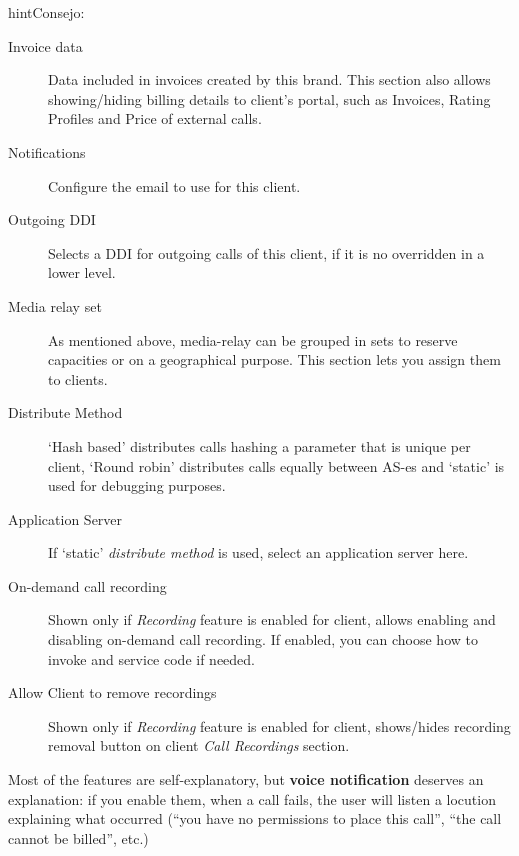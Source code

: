 \documentclass[letterpaper,10pt,spanish]{sphinxmanual}
\begin{document}
\begin{notice}{hint}{Consejo:}
\begin{description}
\item[{Invoice data}] \leavevmode
Data included in invoices created by this brand. This section also allows showing/hiding billing details to
client's portal, such as Invoices, Rating Profiles and Price of external calls.

\item[{Notifications}] \leavevmode
Configure the email {\hyperref[administration_portal/brand/settings/notification_templates:id1]{}} to use for this client.

\item[{Outgoing DDI}] \leavevmode
Selects a DDI for outgoing calls of this client, if it is no overridden in
a lower level.

\item[{Media relay set}] \leavevmode
As mentioned above, media-relay can be grouped in sets to reserve capacities
or on a geographical purpose. This section lets you assign them to clients.

\item[{Distribute Method}] \leavevmode
`Hash based' distributes calls hashing a parameter that is unique per
client, `Round robin' distributes calls equally between AS-es and
`static' is used for debugging purposes.

\item[{Application Server}] \leavevmode
If `static' \emph{distribute method} is used, select an application server here.

\item[{On-demand call recording}] \leavevmode
Shown only if \emph{Recording} feature is enabled for client, allows enabling and
disabling on-demand call recording. If enabled, you can choose how to invoke
and service code if needed.

\item[{Allow Client to remove recordings}] \leavevmode
Shown only if \emph{Recording} feature is enabled for client, shows/hides recording
removal button on client \emph{Call Recordings} section.

\end{description}
\end{notice}

Most of the features are self-explanatory, but \textbf{voice notification} deserves
an explanation: if you enable them, when a call fails, the user will listen a
locution explaining what occurred (``you have no permissions to place this call'',
``the call cannot be billed'', etc.)
\end{document}

